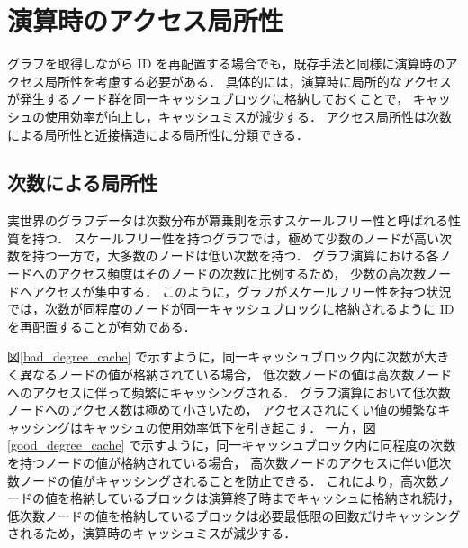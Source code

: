\section{演算時のアクセス局所性}
グラフを取得しながら ID を再配置する場合でも，既存手法と同様に演算時のアクセス局所性を考慮する必要がある．
具体的には，演算時に局所的なアクセスが発生するノード群を同一キャッシュブロックに格納しておくことで，
キャッシュの使用効率が向上し，キャッシュミスが減少する．
アクセス局所性は次数による局所性と近接構造による局所性に分類できる．
\subsection{次数による局所性}
実世界のグラフデータは次数分布が冪乗則を示すスケールフリー性と呼ばれる性質を持つ\cite{barabasi1999emergence,faloutsos1999power,clauset2009power}．
スケールフリー性を持つグラフでは，極めて少数のノードが高い次数を持つ一方で，大多数のノードは低い次数を持つ．
グラフ演算における各ノードへのアクセス頻度はそのノードの次数に比例するため，
少数の高次数ノードへアクセスが集中する．
このように，グラフがスケールフリー性を持つ状況では，次数が同程度のノードが同一キャッシュブロックに格納されるように ID を再配置することが有効である．

図\ref{bad_degree_cache} で示すように，同一キャッシュブロック内に次数が大きく異なるノードの値が格納されている場合，
低次数ノードの値は高次数ノードへのアクセスに伴って頻繁にキャッシングされる．
グラフ演算において低次数ノードへのアクセス数は極めて小さいため，
アクセスされにくい値の頻繁なキャッシングはキャッシュの使用効率低下を引き起こす．
一方，図\ref{good_degree_cache} で示すように，同一キャッシュブロック内に同程度の次数を持つノードの値が格納されている場合，
高次数ノードのアクセスに伴い低次数ノードの値がキャッシングされることを防止できる．
これにより，高次数ノードの値を格納しているブロックは演算終了時までキャッシュに格納され続け，
低次数ノードの値を格納しているブロックは必要最低限の回数だけキャッシングされるため，演算時のキャッシュミスが減少する．


